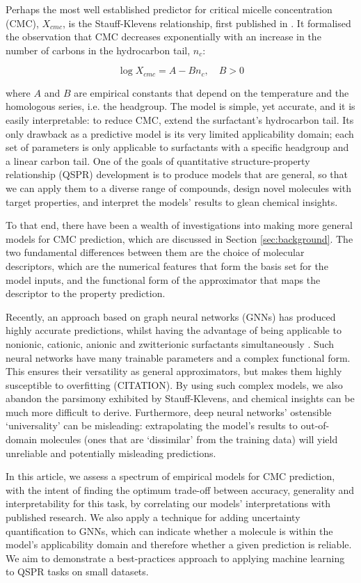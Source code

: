 Perhaps the most well established predictor for critical micelle concentration
(CMC), $X_{cmc}$, is the Stauff-Klevens relationship, first published in
\citeyear{klevensStructureAggregationDilate1953}
\cite{klevensStructureAggregationDilate1953}. It formalised the observation that
CMC decreases exponentially with an increase in the number of carbons in the
hydrocarbon tail, $n_c$:

\begin{equation}
    \label{eq:klevens}
    \log X_{cmc} = A - Bn_c, \quad B > 0
\end{equation}

where $A$ and $B$ are empirical constants that depend on the temperature and the
homologous series, i.e. the headgroup. The model is simple, yet accurate, and it
is easily interpretable: to reduce CMC, extend the surfactant's hydrocarbon
tail. Its only drawback as a predictive model is its very limited applicability
domain; each set of parameters is only applicable to surfactants with a specific
headgroup and a linear carbon tail. One of the goals of quantitative
structure-property relationship (QSPR) development is to produce models that are
general, so that we can apply them to a diverse range of compounds, design novel
molecules with target properties, and interpret the models' results to glean
chemical insights.

To that end, there have been a wealth of investigations into making more general
models for CMC prediction, which are discussed in Section \ref{sec:background}.
The two fundamental differences between them are the choice of molecular
descriptors, which are the numerical features that form the basis set for the
model inputs, and the functional form of the approximator that maps the
descriptor to the property prediction. 

Recently, an approach based on graph neural networks (GNNs) has produced highly
accurate predictions, whilst having the advantage of being applicable to
nonionic, cationic, anionic and zwitterionic surfactants simultaneously
\cite{qinPredictingCriticalMicelle2021}. Such neural networks have many
trainable parameters and a complex functional form. This ensures their
versatility as general approximators, but makes them highly susceptible to
overfitting (CITATION). By using such complex models, we also abandon the
parsimony exhibited by Stauff-Klevens, and chemical insights can be much more
difficult to derive. Furthermore, deep neural networks' ostensible
`universality' can be misleading: extrapolating the model's results to
out-of-domain molecules (ones that are `dissimilar' from the training data) will
yield unreliable and potentially misleading predictions.

In this article, we assess a spectrum of empirical models for CMC prediction,
with the intent of finding the optimum trade-off between accuracy, generality
and interpretability for this task, by correlating our models' interpretations
with published research. We also apply a technique for adding uncertainty
quantification to GNNs, which can indicate whether a molecule is within the
model's applicability domain and therefore whether a given prediction is
reliable. We aim to demonstrate a best-practices approach to applying machine
learning to QSPR tasks on small datasets.
